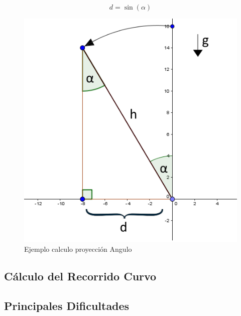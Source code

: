 \documentclass[12pt,a4paper]{article}
\begin{document}
 \begin{figure}[H]
\begin{equation}
\label{eq:proyeccion}
d=\sin(\alpha)
\end{equation}
\end{figure}

  \begin{figure}[H]
  \centering
      \includegraphics[scale=0.5]{images/calculoProyeccion}
      \caption{Ejemplo calculo proyección Angulo}
      \label{fig:proyeccion}
  \end{figure}
  
\subsection{Cálculo del Recorrido Curvo}


  
\subsection{Principales Dificultades}
\end{document}
